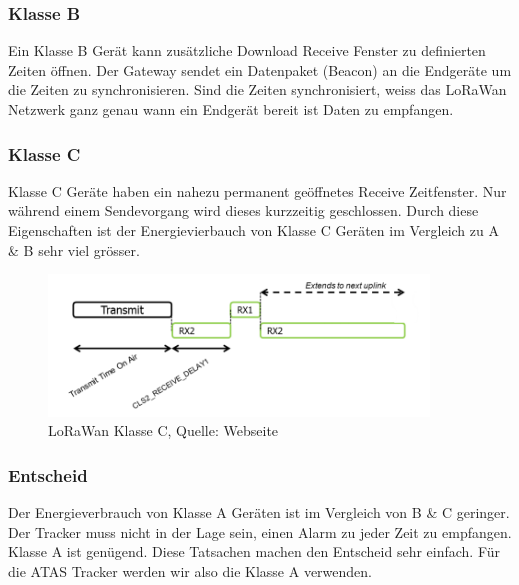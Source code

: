 \documentclass[11pt,english,german]{report}
\theoremstyle{definition}
\begin{document}
\subsubsection{Klasse B}
Ein Klasse B Gerät kann zusätzliche Download Receive Fenster zu definierten Zeiten öffnen. Der Gateway sendet ein Datenpaket (Beacon) an die Endgeräte um die Zeiten zu synchronisieren. Sind die Zeiten synchronisiert, weiss das LoRaWan Netzwerk ganz genau wann ein Endgerät bereit ist Daten zu empfangen. 

\newpage
\subsubsection{Klasse C}
Klasse C Geräte haben ein nahezu permanent geöffnetes Receive Zeitfenster. Nur während einem Sendevorgang wird dieses kurzzeitig geschlossen. Durch diese Eigenschaften ist der Energievierbauch von Klasse C Geräten im Vergleich zu A \& B sehr viel grösser.

\begin{figure}[H]
	\centering
	\includegraphics[width=0.9\textwidth]{img/lora/lorawan_class_c.png}
	\caption[LoRaWan Klasse C]
	{LoRaWan Klasse C, Quelle: Webseite \cite{loraclass}}
\end{figure}

\subsubsection{Entscheid}
Der Energieverbrauch von Klasse A Geräten ist im Vergleich von B \& C geringer. Der Tracker muss nicht in der Lage sein, einen Alarm zu jeder Zeit zu empfangen. Klasse A ist genügend. Diese Tatsachen machen den Entscheid sehr einfach. Für die ATAS Tracker werden wir also die Klasse A verwenden. 

\newpage
\end{document}
